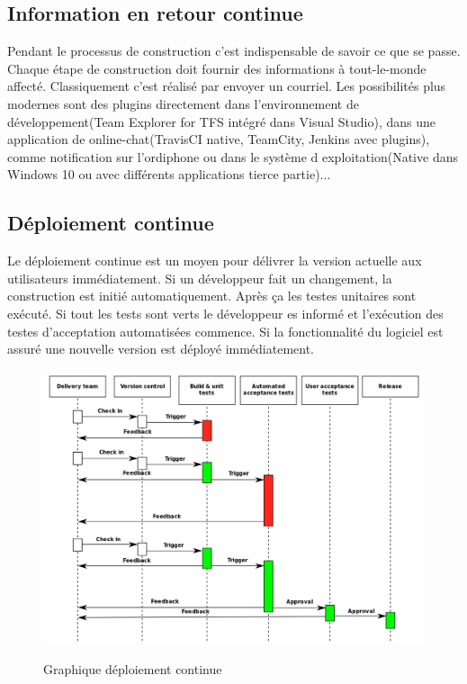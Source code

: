 \subsection{Information en retour continue}

Pendant le processus de construction c'est indispensable de savoir ce que se passe. Chaque étape de construction doit fournir des informations à tout-le-monde affecté. Classiquement c'est réalisé par envoyer un courriel. Les possibilités plus modernes sont des plugins directement dans l'environnement de développement(Team Explorer for TFS intégré dans Visual Studio), dans une application de online-chat(TravisCI native, TeamCity, Jenkins avec plugins), comme notification sur l'ordiphone ou dans le système d exploitation(Native dans Windows 10 ou avec différents applications tierce partie)...





\newpage
\subsection{Déploiement continue}

Le déploiement continue est un moyen pour délivrer la version actuelle aux utilisateurs immédiatement. Si un développeur fait un changement, la construction est initié automatiquement. Après ça les testes unitaires sont exécuté. Si tout les tests sont verts le développeur es informé et l'exécution des testes d'acceptation automatisées commence. Si la fonctionnalité du logiciel est assuré une nouvelle version est déployé immédiatement.


\begin{figure}[H]
\centering
\includegraphics[width=15cm]{bilder/Continuous_Delivery}
\caption{Graphique déploiement continue}\cite{wikicd}
\label{fig:continousdelivery}
\end{figure}





